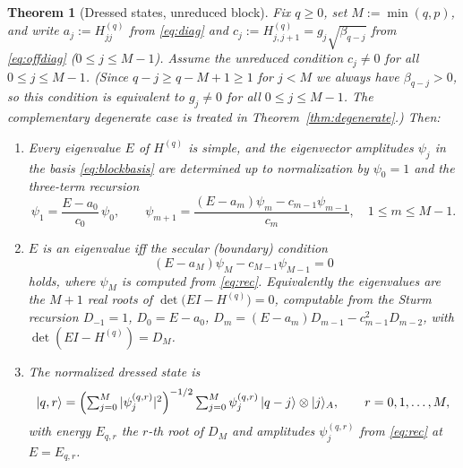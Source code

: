 \documentclass[12pt]{article}
\newtheorem{theorem}{Theorem}
\theoremstyle{definition}
\theoremstyle{remark}
\newcommand{\ket}[1]{\lvert #1\rangle}
\begin{document}
\begin{theorem}[Dressed states, unreduced block]\label{thm:eigvec}
Fix $q\ge0$, set $M:=\min(q,p)$, and write $a_j:=H^{(q)}_{jj}$ from \eqref{eq:diag}
and $c_j:=H^{(q)}_{j,j+1}=g_j\sqrt{\beta_{q-j}}$ from \eqref{eq:offdiag}
($0\le j\le M-1$). \emph{Assume the unreduced condition $c_j\ne0$ for all
$0\le j\le M-1$.} (Since $q-j\ge q-M+1\ge1$ for $j<M$ we always have
$\beta_{q-j}>0$, so this condition is equivalent to $g_j\ne0$ for all $0\le j\le M-1$.
The complementary degenerate case is treated in
Theorem~\ref{thm:degenerate}.) Then:
\begin{enumerate}
\item Every eigenvalue $E$ of $H^{(q)}$ is simple, and the eigenvector amplitudes
$\psi_j$ in the basis \eqref{eq:blockbasis} are determined up to normalization by
$\psi_0=1$ and the three-term recursion
\begin{equation}\label{eq:rec}
\psi_1=\frac{E-a_0}{c_0}\,\psi_0,\qquad
\psi_{m+1}=\frac{(E-a_m)\psi_m-c_{m-1}\psi_{m-1}}{c_m},\quad 1\le m\le M-1.
\end{equation}
\item $E$ is an eigenvalue iff the secular (boundary) condition
\begin{equation}\label{eq:secular}
(E-a_{M})\psi_{M}-c_{M-1}\psi_{M-1}=0
\end{equation}
holds, where $\psi_M$ is computed from \eqref{eq:rec}. Equivalently the eigenvalues
are the $M+1$ real roots of $\det\bigl(E I-H^{(q)}\bigr)=0$, computable from the
Sturm recursion $D_{-1}=1$, $D_0=E-a_0$,
$D_m=(E-a_m)D_{m-1}-c_{m-1}^2 D_{m-2}$, with $\det(EI-H^{(q)})=D_M$.
\item The normalized dressed state is
\begin{equation}\label{eq:dressed}
\ket{q,r}=\Bigl(\textstyle\sum_{j=0}^{M}|\psi_j^{(q,r)}|^2\Bigr)^{-1/2}
\sum_{j=0}^{M}\psi_j^{(q,r)}\,\ket{q-j}\otimes\ket j_A,\qquad r=0,1,\dots,M,
\end{equation}
with energy $E_{q,r}$ the $r$-th root of $D_M$ and amplitudes $\psi^{(q,r)}_j$ from
\eqref{eq:rec} at $E=E_{q,r}$.
\end{enumerate}
\end{theorem}
\end{document}
